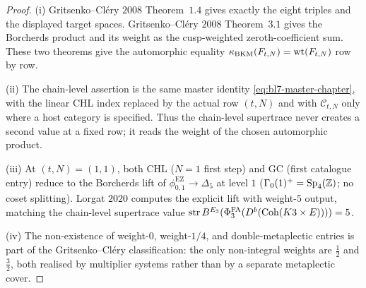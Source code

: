 \begin{proof}
(i) Gritsenko--Cl\'ery $2008$ Theorem~$1.4$ gives exactly the eight
triples and the displayed target spaces. Gritsenko--Cl\'ery $2008$
Theorem~$3.1$ gives the Borcherds product and its weight as the
cusp-weighted zeroth-coefficient sum. These two theorems give the
automorphic equality $\kappa_{\mathrm{BKM}}(F_{t,N})=\mathrm{wt}(F_{t,N})$ row by row.

(ii) The chain-level assertion is the same master identity
\eqref{eq:bl7-master-chapter}, with the linear CHL index replaced by the
actual row $(t,N)$ and with $\mathcal{C}_{t,N}$ only where a host
category is specified. Thus the chain-level supertrace never creates a
second value at a fixed row; it reads the weight of the chosen
automorphic product.

(iii) At $(t,N)=(1,1)$, both CHL ($N = 1$ first step) and GC (first
catalogue entry) reduce to the Borcherds lift of
\(\phi_{0,1}^{\mathrm{EZ}}\to \Delta_5\) at level $1$
($\Gamma_0(1)^+ = \mathrm{Sp}_{4}(\mathbb{Z})$; no coset splitting). Lorgat $2020$ computes
the explicit lift with weight-$5$ output, matching the chain-level
supertrace value $\mathrm{str}\,B^{E_{3}}(\Phi^{\mathrm{FA}}_{3}(D^b(\mathrm{Coh}(K3 \times E))))
= 5$.

(iv) The non-existence of weight-$0$, weight-$1/4$, and
double-metaplectic entries is part of the Gritsenko--Cl\'ery
classification: the only non-integral weights are $\tfrac{1}{2}$ and
$\tfrac{3}{2}$, both realised by multiplier systems rather than by a
separate metaplectic cover.
\end{proof}

